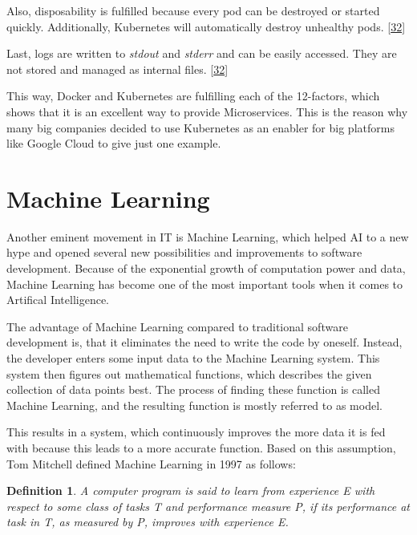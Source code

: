 \documentclass[12pt,english,a4paper,oneside,,tablecaptionabove]{scrbook}
\begin{document}
Also, disposability is fulfilled because every pod can be destroyed or
started quickly. Additionally, Kubernetes will automatically destroy
unhealthy pods. {[}\protect\hyperlink{ref-MichaelD.Elder}{32}{]}

Last, logs are written to \emph{stdout} and \emph{stderr} and can be
easily accessed. They are not stored and managed as internal files.
{[}\protect\hyperlink{ref-MichaelD.Elder}{32}{]}

This way, Docker and Kubernetes are fulfilling each of the 12-factors,
which shows that it is an excellent way to provide Microservices. This
is the reason why many big companies decided to use Kubernetes as an
enabler for big platforms like Google Cloud to give just one example.

\hypertarget{sec:ml}{%
\section{Machine Learning}\label{sec:ml}}

Another eminent movement in IT is Machine Learning, which helped AI to a
new hype and opened several new possibilities and improvements to
software development. Because of the exponential growth of computation
power and data, Machine Learning has become one of the most important
tools when it comes to Artifical Intelligence.

The advantage of Machine Learning compared to traditional software
development is, that it eliminates the need to write the code by
oneself. Instead, the developer enters some input data to the Machine
Learning system. This system then figures out mathematical functions,
which describes the given collection of data points best. The process of
finding these function is called Machine Learning, and the resulting
function is mostly referred to as model.

This results in a system, which continuously improves the more data it
is fed with because this leads to a more accurate function. Based on
this assumption, Tom Mitchell defined Machine Learning in 1997 as
follows:

\newtheorem{definition}{Definition}

\begin{definition}

A computer program is said to learn from experience E with respect to some class of tasks T and performance measure P, if its performance at task in T, as measured by P, improves with experience E. 

\end{definition}
\end{document}
